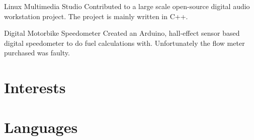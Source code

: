 \documentclass[11pt,a4paper,sans]{moderncv}
\begin{document}
{Linux Multimedia Studio}
{}
{}{}
{Contributed to a large scale open-source digital audio workstation project. The
project is mainly written in C++.}

{Digital Motorbike Speedometer}
{}
{}{}
{Created an Arduino, hall-effect sensor based digital speedometer to do fuel
calculations with. Unfortunately the flow meter purchased was faulty.}


\section{Interests}



\section{Languages}
\end{document}
